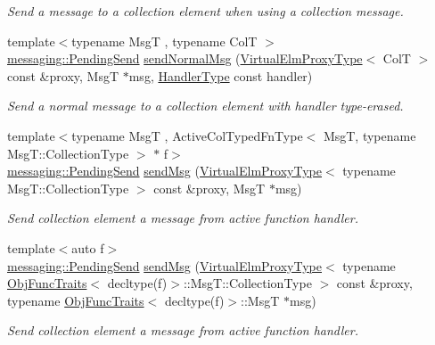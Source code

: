 \begin{DoxyCompactItemize}
\begin{DoxyCompactList}\small\item\em Send a message to a collection element when using a collection message. \end{DoxyCompactList}\item 
{\footnotesize template$<$typename MsgT , typename ColT $>$ }\\\hyperlink{structvt_1_1messaging_1_1_pending_send}{messaging\+::\+Pending\+Send} \hyperlink{structvt_1_1vrt_1_1collection_1_1_collection_manager_a706ce2445fae153c075d3c20f2063507}{send\+Normal\+Msg} (\hyperlink{namespacevt_1_1vrt_a620a5c8c59d13e513f690c74b4af516f}{Virtual\+Elm\+Proxy\+Type}$<$ ColT $>$ const \&proxy, MsgT $\ast$msg, \hyperlink{namespacevt_af64846b57dfcaf104da3ef6967917573}{Handler\+Type} const handler)
\begin{DoxyCompactList}\small\item\em Send a normal message to a collection element with handler type-\/erased. \end{DoxyCompactList}\item 
{\footnotesize template$<$typename MsgT , Active\+Col\+Typed\+Fn\+Type$<$ Msg\+T, typename Msg\+T\+::\+Collection\+Type $>$ $\ast$ f$>$ }\\\hyperlink{structvt_1_1messaging_1_1_pending_send}{messaging\+::\+Pending\+Send} \hyperlink{structvt_1_1vrt_1_1collection_1_1_collection_manager_a3165b258fab15c35985b3f9b8ef0dbe7}{send\+Msg} (\hyperlink{namespacevt_1_1vrt_a620a5c8c59d13e513f690c74b4af516f}{Virtual\+Elm\+Proxy\+Type}$<$ typename Msg\+T\+::\+Collection\+Type $>$ const \&proxy, MsgT $\ast$msg)
\begin{DoxyCompactList}\small\item\em Send collection element a message from active function handler. \end{DoxyCompactList}\item 
{\footnotesize template$<$auto f$>$ }\\\hyperlink{structvt_1_1messaging_1_1_pending_send}{messaging\+::\+Pending\+Send} \hyperlink{structvt_1_1vrt_1_1collection_1_1_collection_manager_a268a9567ecef23da076ad7bf9bec2e3f}{send\+Msg} (\hyperlink{namespacevt_1_1vrt_a620a5c8c59d13e513f690c74b4af516f}{Virtual\+Elm\+Proxy\+Type}$<$ typename \hyperlink{structvt_1_1_obj_func_traits}{Obj\+Func\+Traits}$<$ decltype(f)$>$\+::Msg\+T\+::\+Collection\+Type $>$ const \&proxy, typename \hyperlink{structvt_1_1_obj_func_traits}{Obj\+Func\+Traits}$<$ decltype(f)$>$\+::MsgT $\ast$msg)
\begin{DoxyCompactList}\small\item\em Send collection element a message from active function handler. \end{DoxyCompactList}\item 

\end{DoxyCompactItemize}
